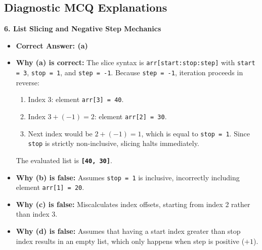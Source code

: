 \subsection*{Diagnostic MCQ Explanations}

\textbf{6. List Slicing and Negative Step Mechanics}
\begin{itemize}
    \item \textbf{Correct Answer: (a)}
    \item \textbf{Why (a) is correct:}
    The slice syntax is \texttt{arr[start:stop:step]} with \texttt{start = 3}, \texttt{stop = 1}, and \texttt{step = -1}.
    Because \texttt{step = -1}, iteration proceeds in reverse:
    \begin{enumerate}
        \item Index 3: element \texttt{arr[3] = 40}.
        \item Index $3 + (-1) = 2$: element \texttt{arr[2] = 30}.
        \item Next index would be $2 + (-1) = 1$, which is equal to \texttt{stop = 1}. Since \texttt{stop} is strictly non-inclusive, slicing halts immediately.
    \end{enumerate}
    The evaluated list is \textbf{\texttt{[40, 30]}}.
    \item \textbf{Why (b) is false:} Assumes \texttt{stop = 1} is inclusive, incorrectly including element \texttt{arr[1] = 20}.
    \item \textbf{Why (c) is false:} Miscalculates index offsets, starting from index 2 rather than index 3.
    \item \textbf{Why (d) is false:} Assumes that having a start index greater than stop index results in an empty list, which only happens when step is positive ($+1$).
\end{itemize}

